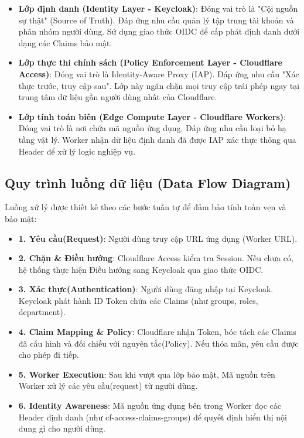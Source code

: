 \begin{itemize}
\item \textbf{Lớp định danh (Identity Layer - Keycloak)}:
Đóng vai trò là "Cội nguồn sự thật" (Source of Truth). Đáp ứng nhu cầu quản lý tập trung tài khoản và phân nhóm người dùng. Sử dụng giao thức OIDC để cấp phát định danh dưới dạng các Claims bảo mật.

\item \textbf{Lớp thực thi chính sách (Policy Enforcement Layer - Cloudflare Access)}: 
Đóng vai trò là Identity-Aware Proxy (IAP). Đáp ứng nhu cầu "Xác thực trước, truy cập sau". Lớp này ngăn chặn mọi truy cập trái phép ngay tại trung tâm dữ liệu gần người dùng nhất của Cloudflare.

\item \textbf{Lớp tính toán biên (Edge Compute Layer - Cloudflare Workers)}: 
Đóng vai trò là nơi chứa mã nguồn ứng dụng. Đáp ứng nhu cầu loại bỏ hạ tầng vật lý. Worker nhận dữ liệu định danh đã được IAP xác thực thông qua Header để xử lý logic nghiệp vụ.
\end{itemize}


\subsection{Quy trình luồng dữ liệu (Data Flow Diagram)}
Luồng xử lý được thiết kế theo các bước tuần tự để đảm bảo tính toàn vẹn và bảo mật:

\begin{itemize}
    \item \textbf{1. Yêu cầu(Request)}: Người dùng truy cập URL ứng dụng (Worker URL).

    \item \textbf{2. Chặn \& Điều hướng}: Cloudflare Access kiểm tra Session. Nếu chưa có, hệ thống thực hiện Điều hướng sang Keycloak qua giao thức OIDC.

    \item \textbf{3. Xác thực(Authentication)}: Người dùng đăng nhập tại Keycloak. Keycloak phát hành ID Token chứa các Claims (như groups, roles, department).

    \item \textbf{4. Claim Mapping \& Policy}: Cloudflare nhận Token, bóc tách các Claims đã cấu hình và đối chiếu với nguyên tắc(Policy). Nếu thỏa mãn, yêu cầu được cho phép đi tiếp.

    \item \textbf{5. Worker Execution}: Sau khi vượt qua lớp bảo mật, Mã nguồn trên Worker xử lý các yêu cầu(request) từ người dùng.

    \item  \textbf{6. Identity Awareness}: Mã nguồn ứng dụng bên trong Worker đọc các Header định danh (như cf-access-claims-groups) để quyết định hiển thị nội dung gì cho người dùng.
\end{itemize}


